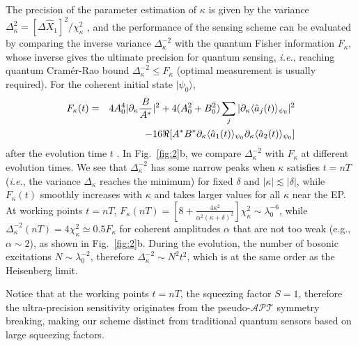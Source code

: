 \documentclass[twocolumn,prl,floatfix,citeautoscript,nofootinbib,superscriptaddress]{revtex4}
\begin{document}
The precision of the parameter estimation of $\kappa $ is given by the
variance $\Delta _{\kappa }^{2}=[\Delta \hat{X}_{1}]^{2}/\chi _{\kappa }^{2}$%
, and the performance of the sensing scheme can be evaluated by comparing
the inverse variance $\Delta _{\kappa }^{-2}$ with the quantum Fisher
information $F_{\kappa }$, whose inverse gives the ultimate precision for
quantum sensing, \textit{i.e.}, reaching quantum Cram\'{e}r-Rao bound $%
\Delta _{\kappa }^{-2}\leq F_{\kappa }$ (optimal measurement is usually
required). For the coherent initial state $|\psi _{0}\rangle $,
\begin{eqnarray}
F_{\kappa }(t) &=&4A_{0}^{4}|\partial _{\kappa }\frac{B}{A^{\ast }}%
|^{2}+4(A_{0}^{2}+B_{0}^{2})\sum_{j}|\partial _{\kappa }\langle \hat{a}%
_{j}(t)\rangle _{\psi _{0}}|^{2}  \notag \\
&&-16\Re \lbrack A^{\ast }B^{\ast }\partial _{\kappa }\langle \hat{a}%
_{1}(t)\rangle _{\psi _{0}}\partial _{\kappa }\langle \hat{a}_{2}(t)\rangle
_{\psi _{0}}]  \label{eq:QFI}
\end{eqnarray}%
after the evolution time $t$ \cite{SM}. In Fig.~\ref{fig:2}b, we compare $%
\Delta _{\kappa }^{-2}$ with $F_{\kappa }$ at different evolution times. We
see that $\Delta _{\kappa }^{-2}$ has some narrow peaks when $\kappa $
satisfies $t=nT$ (\textit{i.e.}, the variance $\Delta _{\kappa }$ reaches
the minimum) for fixed $\delta $ and $|\kappa |\lesssim |\delta |$, while $%
F_{\kappa }(t)$ smoothly increases with $\kappa $ and takes larger values
for all $\kappa $ near the EP. At working points $t=nT$, $F_{\kappa }(nT)=%
\left[ 8+\frac{4\kappa ^{2}}{\alpha ^{2}(\kappa +\delta )^{2}}\right] \chi
_{\kappa }^{2}\sim \lambda _{0}^{-6}$, while $\Delta _{\kappa
}^{-2}(nT)=4\chi _{\kappa }^{2}\simeq 0.5F_{\kappa }$ for coherent
amplitudes $\alpha $ that are not too weak (e.g., $\alpha \sim 2$), as shown
in Fig.~\ref{fig:2}b. During the evolution, the number of bosonic
excitations $N\sim \lambda _{0}^{-2}$, therefore $\Delta _{\kappa }^{-2}\sim
N^{2}t^{2}$, which is at the same order as the Heisenberg limit.

Notice that at the working points $t=nT$, the squeezing factor $S=1$,
therefore the ultra-precision sensitivity originates from the pseudo-$%
\mathcal{APT}$ symmetry breaking, making our scheme distinct from
traditional quantum sensors based on large squeezing factors.
\end{document}
